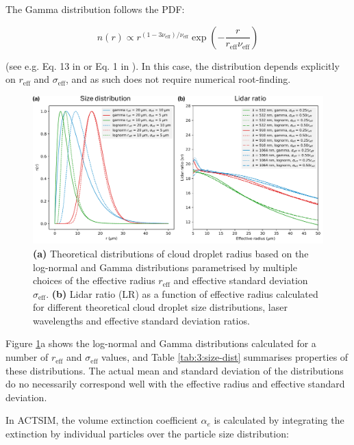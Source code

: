 The Gamma distribution follows the PDF:

\begin{equation}
n(r) \propto r^{(1 - 3\nu_\text{eff})/\nu_\text{eff}}\exp\left(-\frac{r}{r_\text{eff}\nu_\text{eff}}\right)
\end{equation}

(see e.g. Eq. 13 in \cite{petty2011}
or Eq. 1 in \cite{breon2005}). In this case, the distribution depends explicitly on $r_\text{eff}$ and
$\sigma_\text{eff}$, and as such does not require numerical root-finding.

\begin{figure}[t]
\centering
\includegraphics[width=\textwidth]{chapter3/fig/size_dist.pdf}
\caption[Theoretical distributions of cloud droplet radius]{
\textbf{(a)} Theoretical distributions of cloud droplet radius based on
the log-normal and Gamma distributions parametrised
by multiple choices of the effective radius $r_\text{eff}$ and effective standard deviation
$\sigma_\text{eff}$. \textbf{(b)} Lidar ratio (LR) as a function of effective
radius calculated for different theoretical cloud droplet size
distributions, laser wavelengths and effective standard deviation ratios.
}
\label{fig:3:size-dist}
\end{figure}

Figure \ref{fig:3:size-dist}a shows the log-normal and Gamma distributions
calculated for a number of $r_\text{eff}$ and $\sigma_\text{eff}$ values,
and Table \ref{tab:3:size-dist} summarises properties of these distributions.
The actual mean and standard deviation of the distributions do no necessarily
correspond well with the effective radius and effective standard deviation.

In ACTSIM, the volume extinction coefficient $\alpha_e$
is calculated by integrating the extinction by individual particles over the
particle size distribution:

